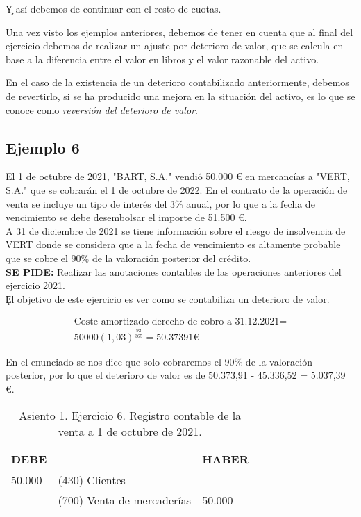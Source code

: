 \c{Y así debemos de continuar con el resto de cuotas.}

Una vez visto los ejemplos anteriores, debemos de tener en cuenta que al final del ejercicio debemos de realizar un ajuste por deterioro de valor, que se calcula en base a la diferencia entre el valor en libros y el valor razonable del activo.

En el caso de la existencia de un deterioro contabilizado anteriormente, debemos de revertirlo, si se ha producido una mejora en la situación del activo, es lo que se conoce como \textit{reversión del deterioro de valor}.

\subsection*{Ejemplo 6}
El 1 de octubre de 2021, "BART, S.A." vendió 50.000 € en mercancías a "VERT, S.A." que se cobrarán el 1 de octubre de 2022. En el contrato de la operación de venta se incluye un tipo de interés del 3\% anual, por lo que a la fecha de vencimiento se debe desembolsar el importe de 51.500 €.\\

A 31 de diciembre de 2021 se tiene información sobre el riesgo de insolvencia de VERT donde se considera que a la fecha de vencimiento es altamente probable que se cobre el 90\% de la valoración posterior del crédito.\\

\textbf{SE PIDE:} Realizar las anotaciones contables de las operaciones anteriores del ejercicio 2021.\\

\c{El objetivo de este ejercicio es ver como se contabiliza un deterioro de valor.}

\begin{align*}
    \text{Coste amortizado derecho de cobro a 31.12.2021} = \\
    50000(1,03)^{\frac{92}{365}} = 50.37391 €
\end{align*}

En el enunciado se nos dice que solo cobraremos el 90\% de la valoración posterior, por lo que el deterioro de valor es de 50.373,91 - 45.336,52 = 5.037,39 €.

\begin{table}[H]
    \centering
    \begin{tabular}{|p{3cm}|p{6cm}|p{3cm}|}
    \hline
    \rowcolor{blue!30}
    \textbf{DEBE} & \textbf{} & \textbf{HABER} \\
    \hline
    50.000 & (430) Clientes &  \\
    \hline
     & (700) Venta de mercaderías & 50.000 \\
    \hline
    \end{tabular}
    \caption{Asiento 1. Ejercicio 6. Registro contable de la venta a 1 de octubre de 2021.}
    \label{tabla:asiento1ej6}
\end{table}

